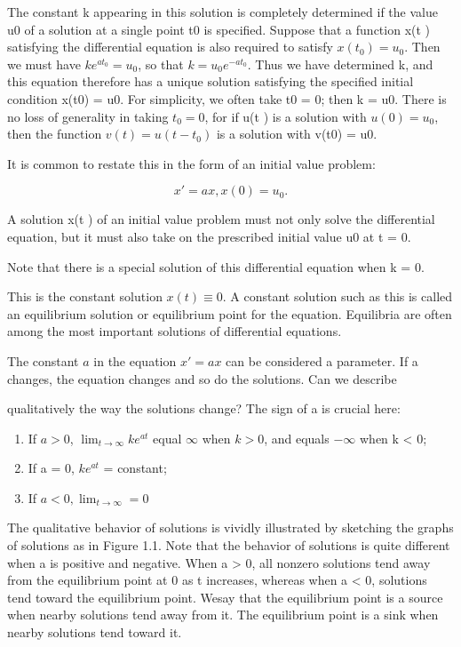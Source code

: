 \documentclass[12pt]{article}
\begin{document}
The constant k appearing in this solution is completely determined if the
value u0 of a solution at a single point t0 is specified. Suppose that a function
x(t ) satisfying the differential equation is also required to satisfy $x(t_0) = u_0$.
Then we must have $ke^{at_0} = u_0$, so that $k = u_0e^{-at_0}$. Thus we have determined
k, and this equation therefore has a unique solution satisfying the specified
initial condition x(t0) = u0. For simplicity, we often take t0 = 0; then k = u0.
There is no loss of generality in taking $t_0 = 0$, for if u(t ) is a solution with
$u(0) = u_0$, then the function $v(t) = u(t - t_0)$ is a solution with v(t0) = u0.

It is common to restate this in the form of an initial value problem:

\[
x' = ax, x(0) = u_0.
\]

A solution x(t ) of an initial value problem must not only solve the differential
equation, but it must also take on the prescribed initial value u0 at t = 0.

Note that there is a special solution of this differential equation when k = 0.

This is the constant solution $x(t) \equiv 0$. A constant solution such as this is called
an equilibrium solution or equilibrium point for the equation. Equilibria are
often among the most important solutions of differential equations.

The constant $a$ in the equation $x' = ax$ can be considered a parameter.
If a changes, the equation changes and so do the solutions. Can we describe

qualitatively the way the solutions change? The sign of a is crucial here:

\begin{enumerate}
\item If $a > 0$, $\lim_{t \to \infty} ke^{at}$ equal $\infty$ when $k > 0$, and equals $- \infty$ when k < 0;
\item If a = 0, $ke^{at}$ = constant;
\item If $a < 0, \lim_{t \to \infty} = 0$
\end{enumerate}

The qualitative behavior of solutions is vividly illustrated by sketching the
graphs of solutions as in Figure 1.1. Note that the behavior of solutions is quite
different when a is positive and negative. When a > 0, all nonzero solutions
tend away from the equilibrium point at 0 as t increases, whereas when a < 0,
solutions tend toward the equilibrium point. Wesay that the equilibrium point
is a source when nearby solutions tend away from it. The equilibrium point is
a sink when nearby solutions tend toward it.
\end{document}
